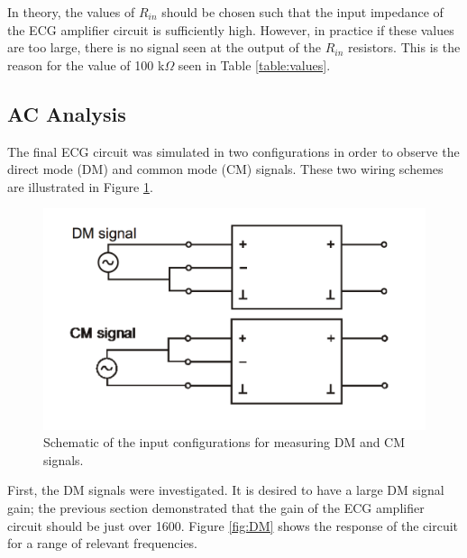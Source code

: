 \documentclass[pdftex,12pt,letterpaper]{article}
\begin{document}
In theory, the values of $R_{in}$ should be chosen such that the input impedance of the ECG amplifier circuit is sufficiently high. However, in practice if these values are too large, there is no signal seen at the output of the $R_{in}$ resistors. This is the reason for the value of 100 k$\Omega$ seen in Table \ref{table:values}.

\subsection{AC Analysis}

The final ECG circuit was simulated in two configurations in order to observe the direct mode (DM) and common mode (CM) signals. These two wiring schemes are illustrated in Figure \ref{fig:DM_CM}.

\begin{figure}[H]
\begin{center}
\includegraphics[scale=.5]{DM_CM.png}
\caption{Schematic of the input configurations for measuring DM and CM signals.}
\label{fig:DM_CM}
\end{center}
\end{figure}

First, the DM signals were investigated. It is desired to have a large DM signal gain; the previous section demonstrated that the gain of the ECG amplifier circuit should be just over 1600. Figure \ref{fig:DM} shows the response of the circuit for a range of relevant frequencies. 
\end{document}
